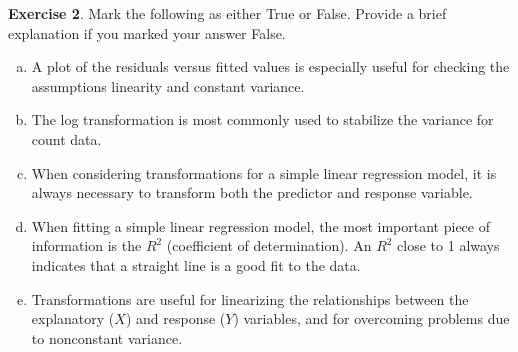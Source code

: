 \documentclass[11pt]{article}\usepackage[]{graphicx}\usepackage[]{color}
\begin{document}
\textbf{Exercise 2}.  Mark the following as either True or False.  Provide a brief explanation if you marked your answer False.
\begin{enumerate}[(a)]
\item A plot of the residuals versus fitted values is especially useful for checking the assumptions linearity and constant variance.
\item The log transformation is most commonly used to stabilize the variance for count data.
\item When considering transformations for a simple linear regression model, it is always necessary to transform both the predictor and response variable.
\item When fitting a simple linear regression model, the most important piece of information is the $R^2$ (coefficient of determination).  An $R^2$ close to 1 always indicates that a straight line is a good fit to the data.
\item Transformations are useful for linearizing the relationships between the explanatory ($X$) and response ($Y$) variables, and for overcoming problems due to nonconstant variance.\\
\end{enumerate}
\clearpage



\end{document}
